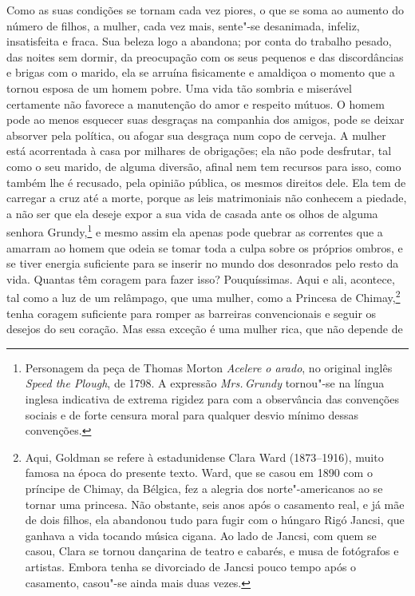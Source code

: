 Como as suas condições se tornam cada vez piores, o que se soma ao
aumento do número de filhos, a mulher, cada vez mais, sente"-se
desanimada, infeliz, insatisfeita e fraca. Sua beleza logo a abandona;
por conta do trabalho pesado, das noites sem dormir, da preocupação com
os seus pequenos e das discordâncias e brigas com o marido, ela se
arruína fisicamente e amaldiçoa o momento que a tornou esposa de um
homem pobre. Uma vida tão sombria e miserável certamente não favorece a
manutenção do amor e respeito mútuos. O homem pode ao menos esquecer
suas desgraças na companhia dos amigos, pode se deixar absorver pela
política, ou afogar sua desgraça num copo de cerveja. A mulher está
acorrentada à casa por milhares de obrigações; ela não pode desfrutar,
tal como o seu marido, de alguma diversão, afinal nem tem recursos para
isso, como também lhe é recusado, pela opinião pública, os mesmos
direitos dele. Ela tem de carregar a cruz até a morte, porque as
leis matrimoniais não conhecem a piedade, a não ser que ela deseje expor
a sua vida de casada ante os olhos de alguma senhora Grundy,\footnote{Personagem
  da peça de Thomas Morton \textit{Acelere o
  arado}, no original inglês \textit{Speed the Plough}, de 1798. A expressão \textit{Mrs.\,Grundy} tornou"-se na língua
  inglesa indicativa de extrema rigidez para com a observância das
  convenções sociais e de forte censura moral para qualquer desvio
  mínimo dessas convenções.} e mesmo assim ela apenas pode quebrar as
correntes que a amarram ao homem que odeia se tomar toda a culpa
sobre os próprios ombros, e se tiver energia suficiente para se inserir
no mundo dos desonrados pelo resto da vida. Quantas têm coragem para
fazer isso? Pouquíssimas. Aqui e ali, acontece, tal como a luz de um
relâmpago, que uma mulher, como a Princesa de Chimay,\footnote{Aqui, Goldman se refere à estadunidense Clara Ward (1873--1916), muito famosa na época do presente texto. Ward, que se casou em 1890 com o príncipe de Chimay, da Bélgica, fez a alegria dos norte"-americanos ao se tornar uma princesa. Não obstante, seis anos após o casamento real, e já mãe de dois filhos, ela abandonou tudo para fugir com o húngaro Rigó Jancsi, que ganhava a vida tocando música cigana. Ao lado de Jancsi, com quem se casou, Clara se tornou dançarina de teatro e cabarés, e musa de fotógrafos e artistas. Embora tenha se divorciado de Jancsi pouco tempo após o casamento, casou"-se ainda mais duas vezes.} tenha coragem
suficiente para romper as barreiras convencionais e seguir os desejos do
seu coração. Mas essa exceção é uma mulher rica, que não depende de
